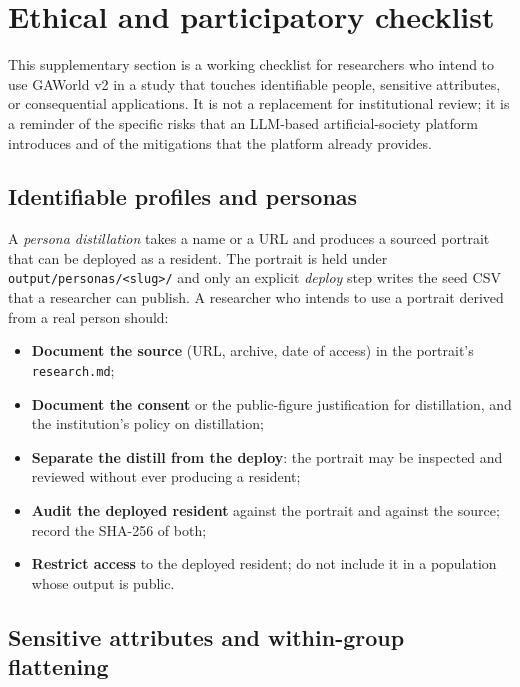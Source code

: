 \section{Ethical and participatory checklist}
\label{supp:ethics}

This supplementary section is a working checklist for researchers who
intend to use GAWorld v2 in a study that touches identifiable people,
sensitive attributes, or consequential applications.  It is not a
replacement for institutional review; it is a reminder of the
specific risks that an LLM-based artificial-society platform
introduces and of the mitigations that the platform already provides.

\subsection{Identifiable profiles and personas}

A \emph{persona distillation} takes a name or a URL and produces a
sourced portrait that can be deployed as a resident.  The portrait
is held under \texttt{output/personas/<slug>/} and only an explicit
\emph{deploy} step writes the seed CSV that a researcher can publish.
A researcher who intends to use a portrait derived from a real
person should:

\begin{itemize}[leftmargin=*]
  \item \textbf{Document the source} (URL, archive, date of access)
  in the portrait's \texttt{research.md};
  \item \textbf{Document the consent} or the public-figure
  justification for distillation, and the institution's policy on
  distillation;
  \item \textbf{Separate the distill from the deploy}: the portrait
  may be inspected and reviewed without ever producing a resident;
  \item \textbf{Audit the deployed resident} against the portrait and
  against the source; record the SHA-256 of both;
  \item \textbf{Restrict access} to the deployed resident; do not
  include it in a population whose output is public.
\end{itemize}

\subsection{Sensitive attributes and within-group flattening}

